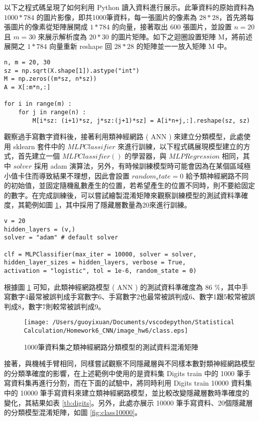 以下之程式碼呈現了如何利用 Python 讀入資料進行展示。此筆資料的原始資料為 $1000*784$ 的圖片影像，即共1000筆資料，每一張圖片的像素為 $28*28$，首先將每張圖片的像素從矩陣展開成 $1*784$ 的向量，接著取出 600 張圖片，並設置 $n = 20$ 且 $m = 30$ 來展示解析度為 $20*30$ 的圖片矩陣。如下之迴圈設置矩陣 M，將前述展開之 $1*784$ 向量重新 reshape 回 $28*28$ 的矩陣並一一放入矩陣 M 中。

\bigskip
\begin{lstlisting}
n, m = 20, 30 
sz = np.sqrt(X.shape[1]).astype("int") 
M = np.zeros((m*sz, n*sz)) 
A = X[:m*n,:] 

for i in range(m) :
    for j in range(n) :
        M[i*sz: (i+1)*sz, j*sz:(j+1)*sz] = A[i*n+j,:].reshape(sz, sz)
\end{lstlisting}

觀察過手寫數字資料後，接著利用類神經網路 ( ANN ) 來建立分類模型，此處使用 sklearn 套件中的 $MLPClassifier$ 來進行訓練，以下程式碼展現模型建立的方式，首先建立一個 $MLPClassifier()$ 的學習器，與 $MLPRegression$ 相同，其中 $solver$ 採用 adam 演算法，另外，有時候訓練模型時可能會因為在某個區域極小值卡住而導致結果不理想，因此會設置 $random_state=0$ 給予類神經網路不同的初始值，並固定隨機亂數產生的位置，若希望產生的位置不同時，則不要給固定的數字。在完成訓練後，可以嘗試繪製混淆矩陣來觀察訓練模型的測試資料準確度，其範例如圖 \ref{fig:class}，其中採用了隱藏層數量為20來進行訓練。

\bigskip
\begin{lstlisting}
v = 20
hidden_layers = (v,) 
solver = "adam" # default solver

clf = MLPClassifier(max_iter = 10000, solver = solver,
hidden_layer_sizes = hidden_layers, verbose = True,
activation = "logistic", tol = 1e-6, random_state = 0)
\end{lstlisting}

根據圖 \ref{fig:class} 可知，此類神經網路模型 ( ANN ) 的測試資料準確度為 86 $\%$，其中手寫數字4最常被誤判成手寫數字6、手寫數字2也最常被誤判成6、數字1跟5較常被誤判成8，數字7則較常被誤判成9。

\begin{figure}[H]
    \centering
        \texttt{[image: /Users/guoyixuan/Documents/vscodepython/Statistical Calculation/Homework6\_CNN/image\_hw6/class.eps]}
    \caption{1000筆資料集之類神經網路分類模型的測試資料混淆矩陣}
    \label{fig:class}
\end{figure}

接著，與機械手臂相同，同樣嘗試觀察不同隱藏層與不同樣本數對類神經網路模型的分類準確度的影響，在上述範例中使用的是資料集 Digits train 中的 1000 筆手寫資料集再進行分割，而在下面的試驗中，將同時利用 Digits train 10000 資料集中的 10000 筆手寫資料來建立類神經網路模型，並比較改變隱藏層數時準確度的變化，其結果如表 \ref{tb:digits}。另外，此處亦展示 10000 筆手寫資料、20個隱藏層的分類模型混淆矩陣，如圖 \ref{fig:class10000}。

